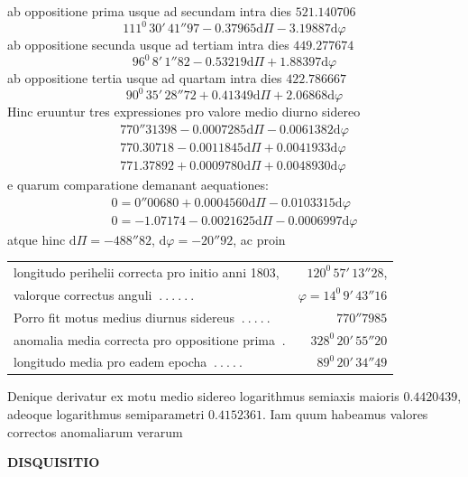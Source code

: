 ab oppositione prima usque ad secundam intra dies $521.140706$
\[
111^0\,30'\,41''97-0.37965\mathrm d\Pi-3.19887\mathrm d\varphi
\]
ab oppositione secunda usque ad tertiam intra dies $449.277674$
\[
96^0\,8'\,1''82-0.53219\mathrm d\Pi+1.88397\mathrm d\varphi
\]
ab oppositione tertia usque ad quartam intra dies $422.786667$
\[
90^0\,35'\,28''72+0.41349\mathrm d\Pi+2.06868\mathrm d\varphi
\]
Hinc eruuntur tres expressiones pro valore medio diurno sidereo
\[
\begin{gathered}
770''31398-0.0007285\mathrm d\Pi-0.0061382\mathrm d\varphi\\
770.30718-0.0011845\mathrm d\Pi+0.0041933\mathrm d\varphi\\
771.37892+0.0009780\mathrm d\Pi+0.0048930\mathrm d\varphi
\end{gathered}
\]
e quarum comparatione demanant aequationes:
\[
\begin{gathered}
0=0''00680+0.0004560\mathrm d\Pi-0.0103315\mathrm d\varphi\\
0=-1.07174-0.0021625\mathrm d\Pi-0.0006997\mathrm d\varphi
\end{gathered}
\]
atque hinc $\mathrm d\Pi=-488''82$, $\mathrm d\varphi=-20''92$, ac proin
\par\nobreak\smallskip
\noindent\hspace*{.06\linewidth}%
{\fontsize{9}{11}\selectfont\begin{tabular}[t]{@{}l@{\enspace}r@{}}
longitudo perihelii correcta pro initio anni 1803,&$120^0\,57'\,13''28$,\\
valorque correctus anguli $\ .\ .\ .\ .\ .\ .$&$\varphi=14^0\,9'\,43''16$\\
Porro fit motus medius diurnus sidereus $\ .\ .\ .\ .\ .$&$770''7985$\\
anomalia media correcta pro oppositione prima $\ .$&$328^0\,20'\,55''20$\\
longitudo media pro eadem epocha $\ .\ .\ .\ .\ .$&$89^0\,20'\,34''49$
\end{tabular}}\par\nobreak\smallskip
\indent Denique derivatur ex motu medio sidereo logarithmus semiaxis maioris $0.4420439$, adeoque logarithmus semiparametri $0.4152361$. Iam quum habeamus valores correctos anomaliarum verarum
\par\GaussVIGathering{}{2\textsuperscript{*}}
\par\clearpage
\thispagestyle{empty}
\noindent{}%
%
\parbox[t]{\dimexpr\linewidth-24mm\relax}{\centering\footnotesize\bfseries DISQUISITIO\par}%
